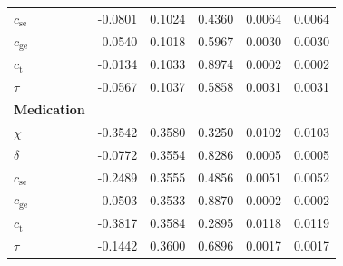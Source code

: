\begin{longtable}{l r r r r r}
        \hspace{4mm} $c_{\text{se}}$ & -0.0801 & 0.1024 & 0.4360 & 0.0064 & 0.0064 \\
        \hspace{4mm} $c_{\text{ge}}$ & 0.0540 & 0.1018 & 0.5967 & 0.0030 & 0.0030 \\
        \hspace{4mm} $c_{\text{t}}$ & -0.0134 & 0.1033 & 0.8974 & 0.0002 & 0.0002 \\
        \hspace{4mm} $\tau$ & -0.0567 & 0.1037 & 0.5858 & 0.0031 & 0.0031 \\
        \midrule
        \textbf{Medication} & & & & & \\
        \hspace{4mm} $\chi$ & -0.3542 & 0.3580 & 0.3250 & 0.0102 & 0.0103 \\
        \hspace{4mm} $\delta$ & -0.0772 & 0.3554 & 0.8286 & 0.0005 & 0.0005 \\
        \hspace{4mm} $c_{\text{se}}$ & -0.2489 & 0.3555 & 0.4856 & 0.0051 & 0.0052 \\
        \hspace{4mm} $c_{\text{ge}}$ & 0.0503 & 0.3533 & 0.8870 & 0.0002 & 0.0002 \\
        \hspace{4mm} $c_{\text{t}}$ & -0.3817 & 0.3584 & 0.2895 & 0.0118 & 0.0119 \\
        \hspace{4mm} $\tau$ & -0.1442 & 0.3600 & 0.6896 & 0.0017 & 0.0017 \\
    \end{longtable}
\endgroup